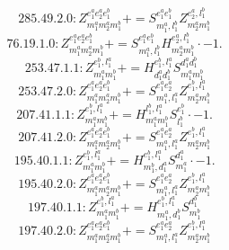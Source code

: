 \documentclass[letterpaper,10pt,fleqn,leqno,onecolumn]{article}
\begin{document}
\begin{equation} \;\;\;\;\;\;  285.49.2.0: Z^{e_{1}^{a}e_{2}^{a}e_{1}^{b}}_{m_{1}^{a}m_{2}^{a}m_{1}^{b}}+=S^{e_{1}^{a}e_{1}^{b}}_{m_{1}^{a},l_{1}^{b}}Z^{e_{2}^{a},l_{1}^{b}}_{m_{2}^{a}m_{1}^{b}} \end{equation}
\begin{equation} \;\;\;\;\;\;  76.19.1.0: Z^{e_{1}^{a}e_{2}^{a}e_{1}^{b}}_{m_{1}^{a}m_{2}^{a}m_{1}^{b}}+=S^{e_{1}^{a}e_{1}^{b}}_{m_{1}^{a},l_{1}^{b}}H^{e_{2}^{a},l_{1}^{b}}_{m_{2}^{a}m_{1}^{b}}\cdot -1. \end{equation}
\begin{equation} \;\;\;\;\;\;  253.47.1.1: Z^{e_{1}^{b},l_{1}^{a}}_{m_{1}^{a}m_{1}^{b}}+=H^{e_{1}^{b},l_{1}^{a}}_{d_{1}^{a}d_{1}^{b}}S^{d_{1}^{a}d_{1}^{b}}_{m_{1}^{a}m_{1}^{b}} \end{equation}
\begin{equation} \;\;\;\;\;\;  253.47.2.0: Z^{e_{1}^{a}e_{2}^{a}e_{1}^{b}}_{m_{1}^{a}m_{2}^{a}m_{1}^{b}}+=S^{e_{1}^{a}e_{2}^{a}}_{m_{1}^{a},l_{1}^{a}}Z^{e_{1}^{b},l_{1}^{a}}_{m_{2}^{a}m_{1}^{b}} \end{equation}
\begin{equation} \;\;\;\;\;\;  207.41.1.1: Z^{e_{1}^{b},l_{1}^{a}}_{m_{1}^{a}m_{1}^{b}}+=H^{l_{1}^{b},l_{1}^{a}}_{m_{1}^{a}m_{1}^{b}}S^{e_{1}^{b}}_{l_{1}^{b}}\cdot -1. \end{equation}
\begin{equation} \;\;\;\;\;\;  207.41.2.0: Z^{e_{1}^{a}e_{2}^{a}e_{1}^{b}}_{m_{1}^{a}m_{2}^{a}m_{1}^{b}}+=S^{e_{1}^{a}e_{2}^{a}}_{m_{1}^{a},l_{1}^{a}}Z^{e_{1}^{b},l_{1}^{a}}_{m_{2}^{a}m_{1}^{b}} \end{equation}
\begin{equation} \;\;\;\;\;\;  195.40.1.1: Z^{e_{1}^{b},l_{1}^{a}}_{m_{1}^{a}m_{1}^{b}}+=H^{e_{1}^{b},l_{1}^{a}}_{m_{1}^{b},d_{1}^{a}}S^{d_{1}^{a}}_{m_{1}^{a}}\cdot -1. \end{equation}
\begin{equation} \;\;\;\;\;\;  195.40.2.0: Z^{e_{1}^{a}e_{2}^{a}e_{1}^{b}}_{m_{1}^{a}m_{2}^{a}m_{1}^{b}}+=S^{e_{1}^{a}e_{2}^{a}}_{m_{1}^{a},l_{1}^{a}}Z^{e_{1}^{b},l_{1}^{a}}_{m_{2}^{a}m_{1}^{b}} \end{equation}
\begin{equation} \;\;\;\;\;\;  197.40.1.1: Z^{e_{1}^{b},l_{1}^{a}}_{m_{1}^{a}m_{1}^{b}}+=H^{e_{1}^{b},l_{1}^{a}}_{m_{1}^{a},d_{1}^{b}}S^{d_{1}^{b}}_{m_{1}^{b}} \end{equation}
\begin{equation} \;\;\;\;\;\;  197.40.2.0: Z^{e_{1}^{a}e_{2}^{a}e_{1}^{b}}_{m_{1}^{a}m_{2}^{a}m_{1}^{b}}+=S^{e_{1}^{a}e_{2}^{a}}_{m_{1}^{a},l_{1}^{a}}Z^{e_{1}^{b},l_{1}^{a}}_{m_{2}^{a}m_{1}^{b}} \end{equation}
\end{document}
